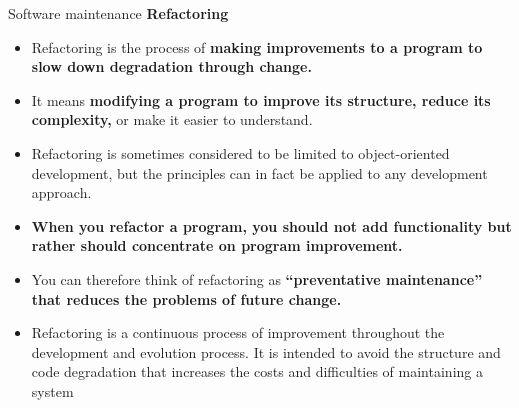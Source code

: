 \documentclass{beamer}
\begin{document}
\begin{frame}{Software maintenance}
	\textbf{Refactoring}
	\begin{itemize}
		\item Refactoring is the process of \textbf{making improvements to a program to slow down degradation through 
			change. }
		\item It means \textbf{modifying a program to improve its structure, reduce its complexity, }or make it easier to 
		understand.
		\item Refactoring is sometimes considered to be limited to object-oriented development, but the principles 
		can in fact be applied to any development approach. 
		\item \textbf{When you refactor a program, you should not add functionality but rather should concentrate on 
			program improvement. }
		\item You can therefore think of refactoring as \textbf{“preventative maintenance” that reduces the problems of 
			future change.}
		\item Refactoring is a continuous process of improvement throughout the development and evolution 
		process. It is intended to avoid the structure and code degradation that increases the costs and 
		difficulties of maintaining a system
	\end{itemize}
\end{frame}
\end{document}
